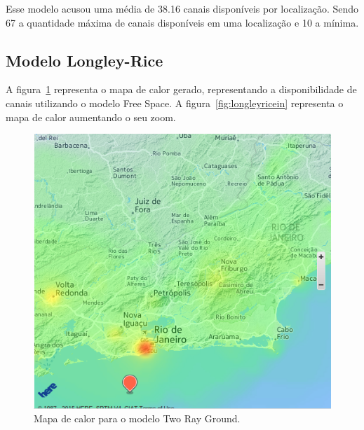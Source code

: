 \FloatBarrier

Esse modelo acusou uma média de 38.16 canais disponíveis por localização. Sendo 67 a quantidade máxima de canais disponíveis em uma localização e 10 a mínima.

\subsection{Modelo Longley-Rice}

A figura~\ref{fig:longleyriceout} representa o mapa de calor gerado, representando a disponibilidade de canais utilizando o modelo Free Space. A figura~\ref{fig:longleyricein} representa o mapa de calor aumentando o seu zoom.

\begin{figure}[htb]
\centering
\includegraphics[width=1.0\textwidth]{figs/longleyriceout}
\caption[Mapa de calor para o modelo Two Ray Ground.]
{Mapa de calor para o modelo Two Ray Ground.}
\label{fig:longleyriceout}
\end{figure} 

